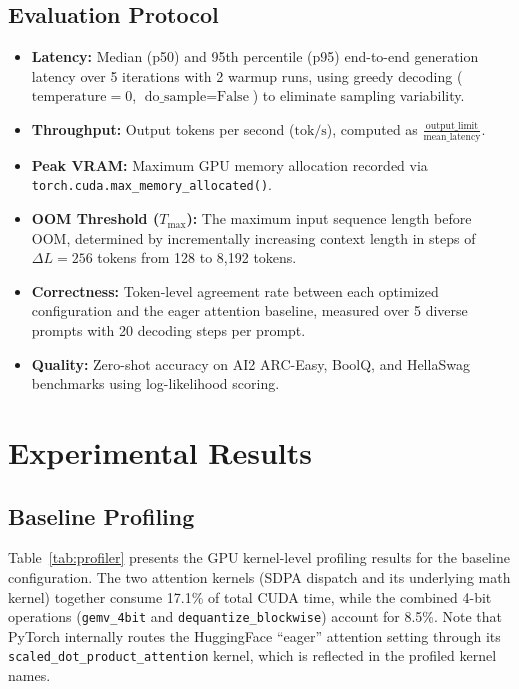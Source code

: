 \documentclass[conference]{IEEEtran}
\begin{document}
\subsection{Evaluation Protocol}
\begin{itemize}
    \item \textbf{Latency:} Median (p50) and 95th percentile (p95) end-to-end generation latency over 5 iterations with 2 warmup runs, using greedy decoding ($\text{temperature}=0$, $\text{do\_sample}=\text{False}$) to eliminate sampling variability.
    \item \textbf{Throughput:} Output tokens per second ($\text{tok/s}$), computed as $\frac{\text{output\_limit}}{\text{mean\_latency}}$.
    \item \textbf{Peak VRAM:} Maximum GPU memory allocation recorded via \texttt{torch.cuda.max\_memory\_allocated()}.
    \item \textbf{OOM Threshold ($T_{\max}$):} The maximum input sequence length before OOM, determined by incrementally increasing context length in steps of $\Delta L = 256$ tokens from 128 to 8{,}192 tokens.
    \item \textbf{Correctness:} Token-level agreement rate between each optimized configuration and the eager attention baseline, measured over 5 diverse prompts with 20 decoding steps per prompt.
    \item \textbf{Quality:} Zero-shot accuracy on AI2 ARC-Easy, BoolQ, and HellaSwag benchmarks using log-likelihood scoring.
\end{itemize}

\section{Experimental Results}
\label{sec:results}

\subsection{Baseline Profiling}
\label{sec:baseline}

Table~\ref{tab:profiler} presents the GPU kernel-level profiling results for the baseline configuration. The two attention kernels (SDPA dispatch and its underlying math kernel) together consume 17.1\% of total CUDA time, while the combined 4-bit operations (\texttt{gemv\_4bit} and \texttt{dequantize\_blockwise}) account for 8.5\%. Note that PyTorch internally routes the HuggingFace ``eager'' attention setting through its \texttt{scaled\_dot\_product\_attention} kernel, which is reflected in the profiled kernel names.
\end{document}
